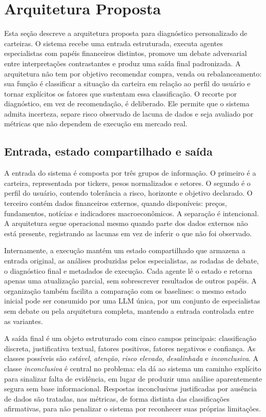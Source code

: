 \section{Arquitetura Proposta}

Esta seção descreve a arquitetura proposta para diagnóstico personalizado de
carteiras. O sistema recebe uma entrada estruturada, executa agentes
especialistas com papéis financeiros distintos, promove um debate
adversarial entre interpretações contrastantes e produz uma saída final
padronizada. A arquitetura não tem por objetivo recomendar compra, venda
ou rebalanceamento: sua função é classificar a situação da carteira em
relação ao perfil do usuário e tornar explícitos os fatores que sustentam
essa classificação. O recorte por diagnóstico, em vez de recomendação, é
deliberado. Ele permite que o sistema admita incerteza, separe risco
observado de lacuna de dados e seja avaliado por métricas que não dependem
de execução em mercado real.

\subsection{Entrada, estado compartilhado e saída}

A entrada do sistema é composta por três grupos de informação. O primeiro
é a carteira, representada por tickers, pesos normalizados e setores. O
segundo é o perfil do usuário, contendo tolerância a risco, horizonte e
objetivo declarado. O terceiro contém dados financeiros externos, quando
disponíveis: preços, fundamentos, notícias e indicadores macroeconômicos.
A separação é intencional. A arquitetura segue operacional mesmo quando
parte dos dados externos não está presente, registrando as lacunas em vez
de inferir o que não foi observado.

Internamente, a execução mantém um estado compartilhado que armazena a
entrada original, as análises produzidas pelos especialistas, as rodadas
de debate, o diagnóstico final e metadados de execução. Cada agente lê o
estado e retorna apenas uma atualização parcial, sem sobrescrever
resultados de outros papéis. A organização também facilita a comparação
com os baselines: o mesmo estado inicial pode ser consumido por uma LLM
única, por um conjunto de especialistas sem debate ou pela arquitetura
completa, mantendo a entrada controlada entre as variantes.

A saída final é um objeto estruturado com cinco campos principais:
classificação discreta, justificativa textual, fatores positivos, fatores
negativos e confiança. As classes possíveis são \textit{estável},
\textit{atenção}, \textit{risco elevado}, \textit{desalinhada} e
\textit{inconclusiva}. A classe \textit{inconclusiva} é central no
problema: ela dá ao sistema um caminho explícito para sinalizar falta de
evidência, em lugar de produzir uma análise aparentemente segura sem base
informacional. Respostas inconclusivas justificadas por ausência de dados
são tratadas, nas métricas, de forma distinta das classificações
afirmativas, para não penalizar o sistema por reconhecer suas próprias
limitações.

